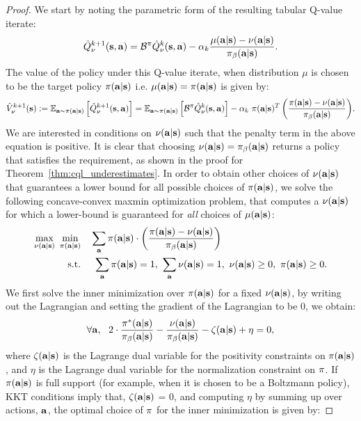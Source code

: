 \begin{proof}
We start by noting the parametric form of the resulting tabular Q-value iterate:
\begin{equation}
    \hat{Q}^{k+1}_\nu(\mathbf{s}, \mathbf{a}) = \mathcal{B}^\pi \hat{Q}^{k}_\nu(\mathbf{s}, \mathbf{a}) - \alpha_k \frac{\mu(\mathbf{a}|\mathbf{s}) - \nu(\mathbf{a}|\mathbf{s})}{{\pi_\beta}(\mathbf{a}|\mathbf{s})}.
    \label{eqn:q_value_nu}
\end{equation}
The value of the policy under this Q-value iterate, when distribution $\mu$ is chosen to be the target policy $\pi(\mathbf{a}|\mathbf{s})$ i.e. $\mu(\mathbf{a}|\mathbf{s}) = \pi(\mathbf{a}|\mathbf{s})$ is given by:
\begin{equation}
    \small{\hat{V}^{k+1}_\nu(\mathbf{s}): = \mathbb{E}_{\mathbf{a}\sim \pi(\mathbf{a}|\mathbf{s})}\left[\hat{Q}^{k+1}_\nu(\mathbf{s}, \mathbf{a})\right] = \mathbb{E}_{\mathbf{a}\sim \pi(\mathbf{a}|\mathbf{s})}\left[\mathcal{B}^\pi\hat{Q}^k_\nu(\mathbf{s}, \mathbf{a}) \right] - \alpha_k~ \pi(\mathbf{a}|\mathbf{s})^T \left(\frac{\pi(\mathbf{a}|\mathbf{s}) - \nu(\mathbf{a}|\mathbf{s})}{{\pi_\beta}(\mathbf{a}|\mathbf{s})}\right)}. 
\end{equation}
We are interested in conditions on $\nu(\mathbf{a}|\mathbf{s})$ such that the penalty term in the above equation is positive. It is clear that choosing $\nu(\mathbf{a}|\mathbf{s}) = {\pi_\beta}(\mathbf{a}|\mathbf{s})$ returns a policy that satisfies the requirement, as shown in the proof for Theorem~\ref{thm:cql_underestimates}. In order to obtain other choices of $\nu(\mathbf{a}|\mathbf{s})$ that guarantees a lower bound for all possible choices of $\pi(\mathbf{a}|\mathbf{s})$, we solve the following concave-convex maxmin optimization problem, that computes a $\nu(\mathbf{a}|\mathbf{s})$ for which a lower-bound is guaranteed for \textit{all} choices of $\mu(\mathbf{a}|\mathbf{s})$:
\begin{align*}
    \max_{\nu(\mathbf{a}|\mathbf{s})} ~\min_{\pi(\mathbf{a}|\mathbf{s})}~~& ~\sum_{\mathbf{a}} \pi(\mathbf{a}|\mathbf{s}) \cdot \left(\frac{\pi(\mathbf{a}|\mathbf{s}) - \nu(\mathbf{a}|\mathbf{s})}{{\pi_\beta}(\mathbf{a}|\mathbf{s})}\right)\\
    \text{s.t.}~~& ~~ \sum_{\mathbf{a}} \pi(\mathbf{a}|\mathbf{s}) = 1,~ \sum_{\mathbf{a}} \nu(\mathbf{a}|\mathbf{s}) = 1,~ \nu(\mathbf{a}|\mathbf{s}) \geq 0,~ \pi(\mathbf{a}|\mathbf{s}) \geq 0. 
\end{align*}
We first solve the inner minimization over $\pi(\mathbf{a}|\mathbf{s})$ for a fixed $\nu(\mathbf{a}|\mathbf{s})$, by writing
out the Lagrangian and setting the gradient of the Lagrangian to be 0, we obtain:
\begin{equation*}
    \forall \mathbf{a}, ~~ 2 \cdot \frac{\pi^*(\mathbf{a}|\mathbf{s})}{{\pi_\beta}(\mathbf{a}|\mathbf{s})} - \frac{\nu(\mathbf{a}|\mathbf{s})}{{\pi_\beta}(\mathbf{a}|\mathbf{s})} - \zeta(\mathbf{a}|\mathbf{s}) + \eta = 0, 
\end{equation*}
where $\zeta(\mathbf{a}|\mathbf{s})$ is the Lagrange dual variable for the positivity constraints on $\pi(\mathbf{a}|\mathbf{s})$, and $\eta$ is the Lagrange dual variable for the normalization constraint on $\pi$. If $\pi(\mathbf{a}|\mathbf{s})$ is full support (for example, when it is chosen to be a Boltzmann policy), KKT conditions imply that, $\zeta(\mathbf{a}|\mathbf{s})$ = 0, and computing $\eta$ by summing up over actions, $\mathbf{a}$, the optimal choice of $\pi$ for the inner minimization is given by:

\end{proof}
